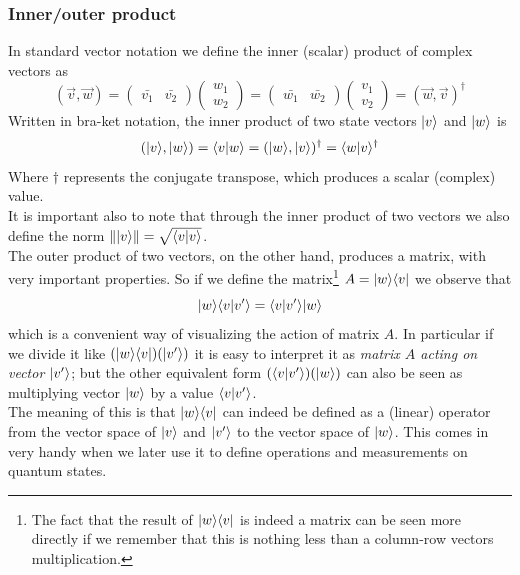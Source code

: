 	
	\subsubsection*{Inner/outer product}
	In standard vector notation we define the inner (scalar) product of complex vectors as
	$$ ( \vec{v}, \vec{w} ) =  \begin{pmatrix} \bar{v_1} & \bar{v_2}\end{pmatrix} \begin{pmatrix} w_1 \\ w_2 \end{pmatrix} = \begin{pmatrix} \bar{w_1} & \bar{w_2}\end{pmatrix} \begin{pmatrix} v_1 \\ v_2 \end{pmatrix} = ( \vec{w}, \vec{v} )^{\dagger}$$
	Written in bra-ket notation, the inner product of two state vectors $|v \rangle$ and $|w \rangle$ is
	$$ ( |v \rangle , |w \rangle ) = \langle v|w\rangle = (|w \rangle , |v \rangle )^{\dagger} = \langle w|v\rangle^{\dagger} $$
	Where $\dagger$ represents the conjugate transpose,	which produces a scalar (complex) value.\\ %
	
	It is important also to note that through the inner product of two vectors we also define the norm $\||v \rangle\|  =  \sqrt{\langle v|v\rangle} $.\\
	
	
	The outer product of two vectors, on the other hand, produces a matrix, with very important properties. So if we define the matrix\footnote{The fact that the result of  $ |w \rangle\langle v| $ is indeed a matrix can be seen more directly if we remember that this is nothing less than a column-row vectors multiplication.} $A =  |w \rangle\langle v| $ we observe that
	$$ |w \rangle\langle v|v'\rangle = \langle v|v'\rangle|w \rangle $$	
	which is a convenient way of visualizing the action of matrix $A$. In particular if we divide it like $(|w \rangle\langle v|) (|v' \rangle) $ it is easy to interpret it as \textit{matrix $A$ acting on vector $|v' \rangle$}; but the other equivalent form $(\langle v|v'\rangle)(|w \rangle)$ can also be seen as multiplying vector $|w \rangle$ by a value $\langle v|v'\rangle$. \\
	The meaning of this is that $|w \rangle\langle v|$ can indeed be defined as a (linear) operator from the vector space of $|v \rangle$ and $|v' \rangle$ to the vector space of $|w \rangle$. This comes in very handy when we later use it to define operations and measurements on quantum states.\\ %
	
